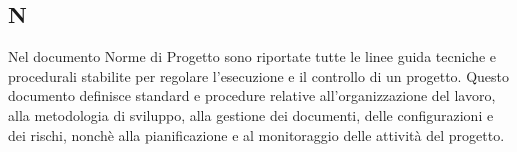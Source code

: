 \begin{center}
\section*{N}
\end{center}
Nel documento Norme di Progetto sono riportate tutte le linee guida tecniche e procedurali stabilite per regolare l'esecuzione e il controllo di un progetto. Questo documento definisce standard e procedure relative all'organizzazione del lavoro, alla metodologia di sviluppo, alla gestione dei documenti, delle configurazioni e dei rischi, nonchè alla pianificazione e al monitoraggio delle attività del progetto.
